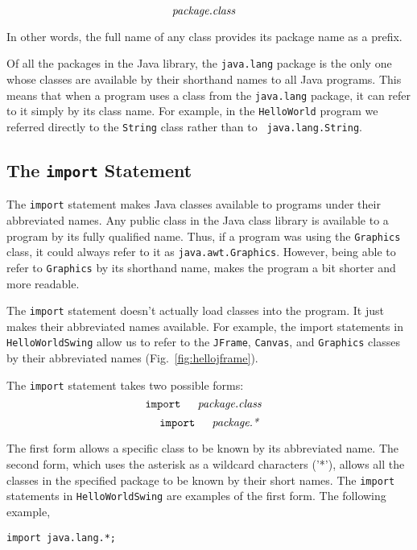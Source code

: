 $$
\hbox{\it package.class}\quad
$$

\noindent In other words, the full name of any class provides
its package name as a prefix.

Of all the packages in the Java library, the {\tt java.lang} package
is the only one whose classes are available by their shorthand names
to all Java programs. This means that when a program uses a class from
the {\tt java.lang} package, it can refer to it simply by its class
name. For example, in the {\tt HelloWorld} program we referred
directly to the {\tt String} class rather than to {\tt
java.lang.String}.

\subsection{The {\tt import} Statement}

The {\tt import} statement makes Java classes available to programs
under their abbreviated names. Any public class in the Java class
library is available to a program by its fully qualified name.  Thus,
if a program was using the {\tt Graphics} class, it could always refer
to it as {\tt java.awt.Graphics}.  However, being able to refer to
{\tt Graphics} by its shorthand name, makes the program a bit
shorter and more readable.

The {\tt import} statement doesn't actually load classes into the
program. It just makes their abbreviated names available.  For
example, the import statements in {\tt HelloWorldSwing} allow us to
refer to the {\tt JFrame}, {\tt Canvas}, and {\tt Graphics} classes by their
abbreviated names (Fig.~\ref{fig:hellojframe}).

The {\tt import} statement takes two possible forms:
$$
\hbox{\tt import }\quad
\hbox{\it package.class}\quad
$$
$$
\hbox{\tt import }\quad
\hbox{\it package.*}\quad\\
$$

\noindent The first form allows a specific class to be known
by its abbreviated name. The second form, which uses the asterisk as a
wildcard characters ('*'), allows all the classes in the specified
package to be known by their short names. The {\tt import} statements
in {\tt HelloWorldSwing} are examples of the first form. The
following example,

\begin{jjjlisting}
\begin{lstlisting}
import java.lang.*;
\end{lstlisting}
\end{jjjlisting}

